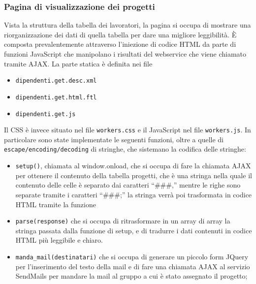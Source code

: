 \subsubsection{Pagina di visualizzazione dei progetti}
Vista la struttura della tabella dei lavoratori, la pagina si occupa di mostrare una riorganizzazione dei dati di quella tabella per dare una migliore leggibilità.
È composta prevalentemente attraverso l’iniezione di codice HTML da parte di funzioni JavaScript che manipolano i risultati del webservice che viene chiamato tramite AJAX.
La parte statica è definita nei file
\begin {itemize}
\item \texttt{dipendenti.get.desc.xml}
\item \texttt{dipendenti.get.html.ftl}
\item \texttt{dipendenti.get.js}
\end{itemize}
Il CSS è invece situato nel file \texttt{workers.css}  e il JavaScript nel file \texttt{workers.js}. In particolare sono state implementate le seguenti funzioni, oltre a quelle di \texttt{escape/encoding/decoding} di stringhe, che sistemano la codifica delle stringhe:
\begin{itemize}
\item \texttt{setup()}, chiamata al window.onload, che si occupa di fare la chiamata AJAX per ottenere il contenuto della tabella progetti, che è una stringa nella quale il contenuto delle celle è separato dai caratteri  “\#\#\#,” mentre le righe sono separate tramite i caratteri “\#\#\#;” la stringa verrà poi trasformata in codice HTML tramite la funzione
\item \texttt{parse(response)} che si occupa di ritrasformare in un array di array la stringa passata dalla funzione di setup, e di tradurre i dati contenuti in codice HTML  più leggibile e chiaro.
\item \texttt{manda\_mail(destinatari)} che si occupa di generare un piccolo form JQuery per l'inserimento del testo della mail e di fare una chiamata AJAX al servizio SendMails per mandare la mail al gruppo a cui è stato assegnato il progetto;
\end{itemize}

